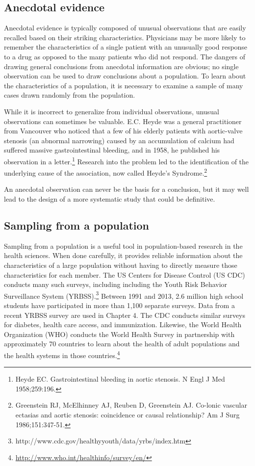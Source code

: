 \subsection{Anecdotal evidence}
\label{anecdotalEvidence}

Anecdotal evidence is typically composed of unusual observations that are easily recalled based on their striking characteristics. Physicians may be more likely to remember the characteristics of a single patient with an unusually good response to a drug as opposed to the many patients who did not respond.  The dangers of drawing general conclusions from anecdotal information are obvious; no single observation can be used to draw conclusions about a population. To learn about the characteristics of a population, it is necessary to examine a sample of many cases drawn randomly from the population.

While it is incorrect to generalize from individual observations, unusual observations can sometimes be valuable.  E.C. Heyde was a general practitioner from Vancouver who noticed that a few of his elderly patients with aortic-valve stenosis (an abnormal narrowing) caused by an accumulation of calcium had suffered massive gastrointestinal bleeding, and in 1958, he published his observation in a letter.\footnote{Heyde EC. Gastrointestinal bleeding in aortic stenosis. N Engl J Med 1958;259:196.} Research into the problem led to the identification of the underlying cause of the association, now called Heyde's Syndrome.\footnote{Greenstein RJ, McElhinney AJ, Reuben D, Greenstein AJ. Co-lonic vascular ectasias and aortic stenosis: coincidence or causal relationship? Am J Surg 1986;151:347-51.}

An anecdotal observation can never be the basis for a conclusion, but it may well lead to the design of a more systematic study that could be definitive.  


\subsection{Sampling from a population}

Sampling from a population is a useful tool in population-based research in the health sciences.  When done carefully, it provides reliable information about the  characteristics of a large population without having to directly measure those characteristics for each member.  The US Centers for Disease Control (US CDC) conducts many such surveys, including including the Youth Risk Behavior Surveillance System (YRBSS).\footnote{http://www.cdc.gov/healthyyouth/data/yrbs/index.htm} Between 1991 and 2013, 2.6 million high school students have participated in more than 1,100 separate surveys. Data from a recent YRBSS survey are used in Chapter 4. The CDC conducts similar surveys for diabetes, health care access, and immunization. Likewise, the World Health Organization (WHO) conducts the World Health Survey in partnership  with approximately 70 countries to learn about the health of adult populations and the health systems in those countries.\footnote{\url{http://www.who.int/healthinfo/survey/en/}}  

